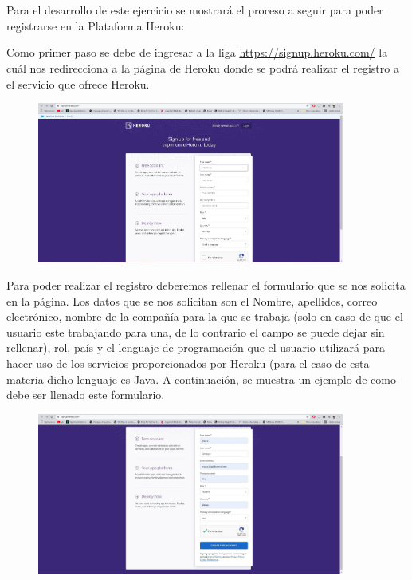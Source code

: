 \documentclass[10pt,a4paper]{article} %
\begin{document}
	\pagebreak
	
	\section{\color{colorIPN}{Desarrollo}}
	{\large Para el desarrollo de este ejercicio se mostrar{\' a} el proceso a seguir para poder registrarse en la Plataforma Heroku:}
	
	\begin{enumerate}
		{\large
			\item Como primer paso se debe de ingresar a la liga \underline{https://signup.heroku.com/} la cu{\'a}l nos redirecciona a la p{\'a}gina de Heroku donde se podr{\'a} realizar el registro a el servicio que ofrece Heroku.
			\begin{figure}[H]
				\includegraphics[width=0.9\textwidth]{1.jpg}
				\centering
				\label{img:paso1}
			\end{figure}
			\item Para poder realizar el registro deberemos rellenar el formulario que se nos solicita en la p{\'a}gina. Los datos que se nos solicitan son el Nombre, apellidos, correo electr{\'o}nico, nombre de la compa{\~n}{\'i}a para la que se trabaja (solo en caso de que el usuario este trabajando para una, de lo contrario el campo se puede dejar sin rellenar), rol, pa{\'i}s y el lenguaje de programaci{\'o}n que el usuario utilizar{\'a} para hacer uso de los servicios proporcionados por Heroku (para el caso de esta materia dicho lenguaje es Java. A continuaci{\'o}n, se muestra un ejemplo de como debe ser llenado este formulario.
			\begin{figure}[H]
				\includegraphics[width=0.9\textwidth]{2.jpg}
				\centering
				\label{img:paso2}
			\end{figure}
			
}
\end{enumerate}
\end{document}
